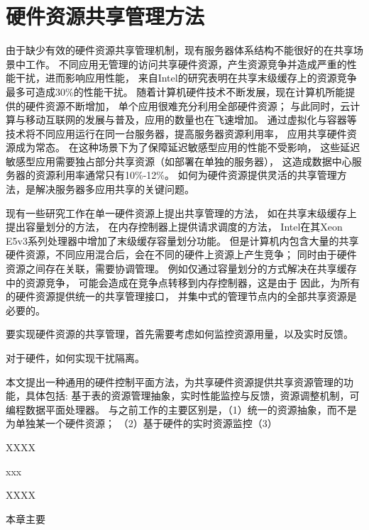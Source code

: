 

\chapter{硬件资源共享管理方法}
\label{chap:hwresman}

由于缺少有效的硬件资源共享管理机制，现有服务器体系结构不能很好的在共享场景中工作。
不同应用无管理的访问共享硬件资源，产生资源竞争并造成严重的性能干扰，进而影响应用性能，
来自Intel的研究\cite{intel}表明在共享末级缓存上的资源竞争最多可造成30\%的性能干扰。
随着计算机硬件技术不断发展，现在计算机所能提供的硬件资源不断增加，
单个应用很难充分利用全部硬件资源；
与此同时，云计算与移动互联网的发展与普及，应用的数量也在飞速增加。
通过虚拟化与容器等技术将不同应用运行在同一台服务器，提高服务器资源利用率，
应用共享硬件资源成为常态。
在这种场景下为了保障延迟敏感型应用的性能不受影响，
这些延迟敏感型应用需要独占部分共享资源（如部署在单独的服务器\cite{}），
这造成数据中心服务器的资源利用率通常只有10\%-12\%。
如何为硬件资源提供灵活的共享管理方法，是解决服务器多应用共享的关键问题。


现有一些研究工作在单一硬件资源上提出共享管理的方法，
如在共享末级缓存上提出容量划分的方法\cite{}，
在内存控制器上提供请求调度的方法\cite{}，
Intel在其Xeon E5v3系列处理器中增加了末级缓存容量划分功能。
但是计算机内包含大量的共享硬件资源，不同应用混合后，会在不同的硬件上资源上产生竞争；
同时由于硬件资源之间存在关联，需要协调管理。
例如仅通过容量划分的方式解决在共享缓存中的资源竞争，
可能会造成在竞争点转移到内存控制器，这是由于
因此，为所有的硬件资源提供统一的共享管理接口，
并集中式的管理节点内的全部共享资源是必要的。


%
要实现硬件资源的共享管理，首先需要考虑如何监控资源用量，以及实时反馈。 %

对于硬件，如何实现干扰隔离。 %

本文提出一种通用的硬件控制平面方法，为共享硬件资源提供共享资源管理的功能，具体包括:
基于表的资源管理抽象，实时性能监控与反馈，资源调整机制，可编程数据平面处理器。
与之前工作的主要区别是，（1）统一的资源抽象，而不是为单独某一个硬件资源；
（2）基于硬件的实时资源监控（3）

XXXX

xxx

XXXX

本章主要


